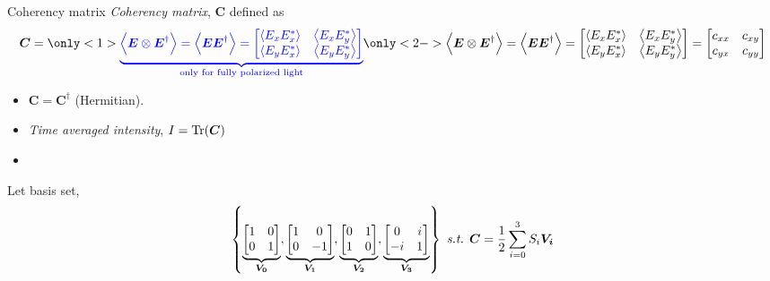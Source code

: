 \documentclass[12pt, dvipsnames]{beamer}
\numberwithin{equation}{section}
\begin{document}
\begin{frame}{Coherency matrix}
	\textit{Coherency matrix}, $\boldsymbol{C}$ defined as 
	\begin{align*}
		\boldsymbol{C}=\only<1>{{\color{blue}\underbrace{\expval{\boldsymbol{E}\otimes\boldsymbol{E}^\dagger}= \expval{\boldsymbol{E}\boldsymbol{E}^\dagger}=
		\begin{bmatrix}
			\expval{E_xE_x^\ast} & \expval{E_xE_y^\ast}\\
			\expval{E_yE_x^\ast} & \expval{E_yE_y^\ast}
		\end{bmatrix}}_{\text{only for fully polarized light}}}}
		\only<2->{\expval{\boldsymbol{E}\otimes\boldsymbol{E}^\dagger}= \expval{\boldsymbol{E}\boldsymbol{E}^\dagger}=
			\begin{bmatrix}
				\expval{E_xE_x^\ast} & \expval{E_xE_y^\ast}\\
				\expval{E_yE_x^\ast} & \expval{E_yE_y^\ast}
			\end{bmatrix}}=
		\begin{bmatrix}
			c_{xx} & c_{xy}\\
			c_{yx} & c_{yy}
		\end{bmatrix}
	\end{align*}\pause
	\begin{itemize}
		\item
		$\boldsymbol{C}=\boldsymbol{C}^\dagger$ (Hermitian).
		
		\item 
		\textit{Time averaged intensity}, $I=\Tr(\boldsymbol{C})$
		
		\item {}
	\end{itemize}\pause

	Let basis set, 
	$$\left\{
	\underbrace{\begin{bmatrix}1 & 0 \\ 0 & 1\\\end{bmatrix}}_{\boldsymbol{V_0}},
	\underbrace{\begin{bmatrix}1 & 0 \\ 0 & -1\\\end{bmatrix}}_{\boldsymbol{V_1}},
	\underbrace{\begin{bmatrix}0 & 1 \\ 1 & 0\\\end{bmatrix}}_{\boldsymbol{V_2}},
	\underbrace{\begin{bmatrix}0 & i \\ -i & 1\\\end{bmatrix}}_{\boldsymbol{V_3}}
	\right\} \text{ \textit{s.t.} } \boldsymbol{C} = \frac{1}{2} \sum_{i=0}^{3} S_i \boldsymbol{V_i}$$
\end{frame}
\end{document}
